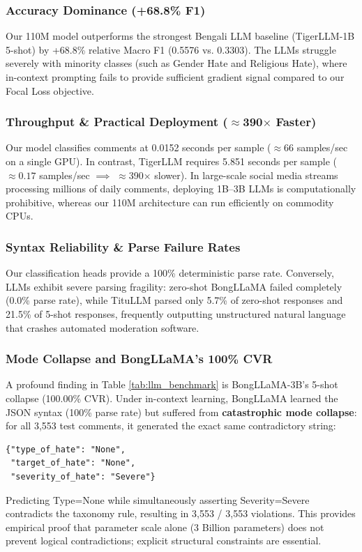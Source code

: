 \documentclass[conference]{IEEEtran}
\begin{document}
\subsubsection{Accuracy Dominance (+68.8\% F1)}
Our 110M model outperforms the strongest Bengali LLM baseline (TigerLLM-1B 5-shot) by +68.8\% relative Macro F1 (0.5576 vs. 0.3303). The LLMs struggle severely with minority classes (such as Gender Hate and Religious Hate), where in-context prompting fails to provide sufficient gradient signal compared to our Focal Loss objective.

\subsubsection{Throughput \& Practical Deployment ($\approx$390$\times$ Faster)}
Our model classifies comments at 0.0152 seconds per sample ($\approx 66$ samples/sec on a single GPU). In contrast, TigerLLM requires 5.851 seconds per sample ($\approx 0.17$ samples/sec $\implies$ $\approx$390$\times$ slower). In large-scale social media streams processing millions of daily comments, deploying 1B--3B LLMs is computationally prohibitive, whereas our 110M architecture can run efficiently on commodity CPUs.

\subsubsection{Syntax Reliability \& Parse Failure Rates}
Our classification heads provide a 100\% deterministic parse rate. Conversely, LLMs exhibit severe parsing fragility: zero-shot BongLLaMA failed completely (0.0\% parse rate), while TituLLM parsed only 5.7\% of zero-shot responses and 21.5\% of 5-shot responses, frequently outputting unstructured natural language that crashes automated moderation software.

\subsubsection{Mode Collapse and BongLLaMA's 100\% CVR}
A profound finding in Table \ref{tab:llm_benchmark} is BongLLaMA-3B's 5-shot collapse (100.00\% CVR). Under in-context learning, BongLLaMA learned the JSON syntax (100\% parse rate) but suffered from \textbf{catastrophic mode collapse}: for all 3,553 test comments, it generated the exact same contradictory string:
\begin{verbatim}
{"type_of_hate": "None", 
 "target_of_hate": "None", 
 "severity_of_hate": "Severe"}
\end{verbatim}
Predicting Type=None while simultaneously asserting Severity=Severe contradicts the taxonomy rule, resulting in 3,553 / 3,553 violations. This provides empirical proof that parameter scale alone (3 Billion parameters) does not prevent logical contradictions; explicit structural constraints are essential.
\end{document}

